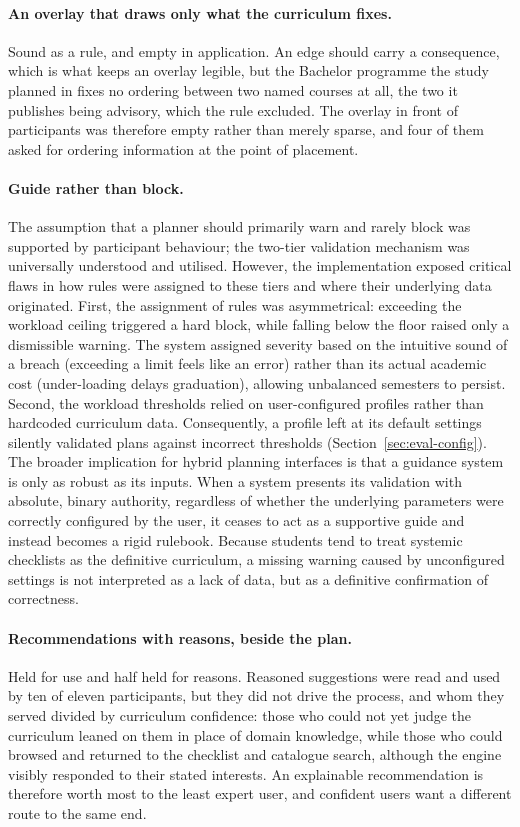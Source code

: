 \paragraph{An overlay that draws only what the curriculum fixes.}
Sound as a rule, and empty in application. An edge should carry a consequence, which is what keeps an overlay legible, but the Bachelor programme the study planned in fixes no ordering between two named courses at all, the two it publishes being advisory, which the rule excluded. The overlay in front of participants was therefore empty rather than merely sparse, and four of them asked for ordering information at the point of placement.

\paragraph{Guide rather than block.}
The assumption that a planner should primarily warn and rarely block was supported by participant behaviour; the two-tier validation mechanism was universally understood and utilised. However, the implementation exposed critical flaws in how rules were assigned to these tiers and where their underlying data originated. First, the assignment of rules was asymmetrical: exceeding the workload ceiling triggered a hard block, while falling below the floor raised only a dismissible warning. The system assigned severity based on the intuitive sound of a breach (exceeding a limit feels like an error) rather than its actual academic cost (under-loading delays graduation), allowing unbalanced semesters to persist. Second, the workload thresholds relied on user-configured profiles rather than hardcoded curriculum data. Consequently, a profile left at its default settings silently validated plans against incorrect thresholds (Section~\ref{sec:eval-config}). The broader implication for hybrid planning interfaces is that a guidance system is only as robust as its inputs. When a system presents its validation with absolute, binary authority, regardless of whether the underlying parameters were correctly configured by the user, it ceases to act as a supportive guide and instead becomes a rigid rulebook. Because students tend to treat systemic checklists as the definitive curriculum, a missing warning caused by unconfigured settings is not interpreted as a lack of data, but as a definitive confirmation of correctness.

\paragraph{Recommendations with reasons, beside the plan.}
Held for use and half held for reasons. Reasoned suggestions were read and used by ten of eleven participants, but they did not drive the process, and whom they served divided by curriculum confidence: those who could not yet judge the curriculum leaned on them in place of domain knowledge, while those who could browsed and returned to the checklist and catalogue search, although the engine visibly responded to their stated interests. An explainable recommendation is therefore worth most to the least expert user, and confident users want a different route to the same end.

